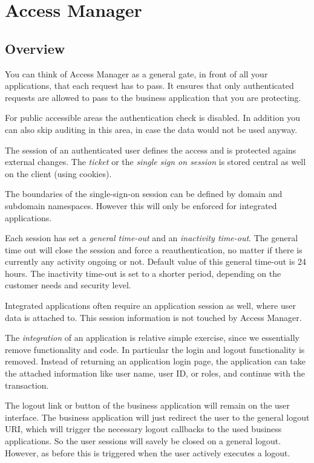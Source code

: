 
\section{Access Manager}

\subsection{Overview}

You can think of Access Manager as a general gate, in front of all your
applications, that each request has to pass. It ensures that only
authenticated requests are allowed to pass to the business application
that you are protecting.

For public accessible areas the authentication check is disabled. In
addition you can also skip auditing in this area, in case the data would
not be used anyway.

The session of an authenticated user defines the access and is protected 
agains external changes. The \emph{ticket} or the \emph{single sign on 
session} is stored central as well on the client (using cookies).

The boundaries of the single-sign-on session can be defined by domain
and subdomain namespaces. However this will only be enforced for
integrated applications.

Each session has set a \emph{general time-out} and an \emph{inactivity
time-out}. The general time out will close the session and force a
reauthentication, no matter if there is currently any activity ongoing
or not. Default value of this general time-out is 24 hours. The
inactivity time-out is set to a shorter period, depending on the
customer needs and security level.

Integrated applications often require an application session as well,
where user data is attached to. This session information is not touched 
by Access Manager.


The \emph{integration} of an application is relative simple exercise, since we
essentially remove functionality and code. In particular the login and
logout functionality is removed. Instead of returning an application
login page, the application can take the attached information like user
name, user ID, or roles, and continue with the transaction.

The logout link or button of the business application will remain on the
user interface. The business application will just redirect the user to
the general logout URI, which will trigger the necessary logout
callbacks to the used business applications. So the user sessions will
savely be closed on a general logout. However, as before this is
triggered when the user actively executes a logout.

